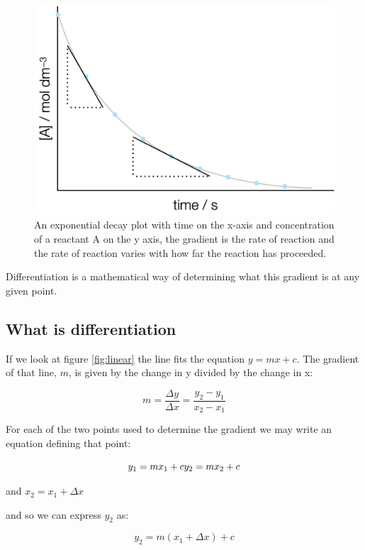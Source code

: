 \documentclass[
]{book}
\begin{document}
\begin{figure}

{\centering \includegraphics[width=0.5\linewidth]{images/expplot} 

}

\caption{An exponential decay plot with time on the x-axis and concentration of a reactant A on the y axis, the gradient is the rate of reaction and the rate of reaction varies with how far the reaction has proceeded.}\label{fig:expplot}
\end{figure}

Differentiation is a mathematical way of determining what this gradient is at any given point.

\hypertarget{subsec:whatisdiff}{%
\subsection{What is differentiation}\label{subsec:whatisdiff}}

If we look at figure \ref{fig:linear} the line fits the equation \(y = mx+c\). The gradient of that line, \(m\), is given by the change in y divided by the change in x:

\begin{equation*}
m = \frac{\Delta y}{\Delta x} = \frac{y_2-y_1}{x_2-x_1}
\end{equation*}

For each of the two points used to determine the gradient we may write an equation defining that point:

\begin{equation*}
y_1 = mx_1 + c\\
y_2 = mx_2 + c
\end{equation*}

and \(x_2 = x_1+\Delta x\)

and so we can express \(y_2\) as:

\begin{equation*}
y_2 = m(x_1+ \Delta x) + c
\end{equation*}
\end{document}

